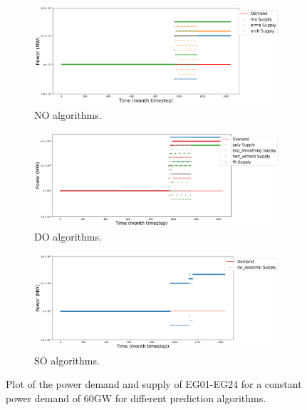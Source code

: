 \documentclass[11pt]{article}
\begin{document}
\begin{figure}[!htbp]
	\centering
	\begin{subfigure}[t]{\textwidth}
		\centering
		\includegraphics[width=\linewidth]{24-power-bufferB20001.png} 
		\caption{NO algorithms.}
		\label{fig:24powerNO}
	\end{subfigure}
	\vspace{1cm}
	\begin{subfigure}[t]{\textwidth}
		\centering
		\includegraphics[width=\linewidth]{24-power-bufferB20002.png} 
		\caption{DO algorithms.}
		\label{fig:24powerDO}
	\end{subfigure}
	\begin{subfigure}[t]{.95\textwidth}
		\centering
		\includegraphics[width=\linewidth]{24-power-bufferB20003.png} 
		\caption{SO algorithms.}
		\label{fig:24powerSO}
\end{subfigure}
	\hfill
	\caption{Plot of the power demand and supply of EG01-EG24 for a constant power demand of 60GW for different prediction algorithms.}
	\label{fig:24power}
\end{figure}
\end{document}
